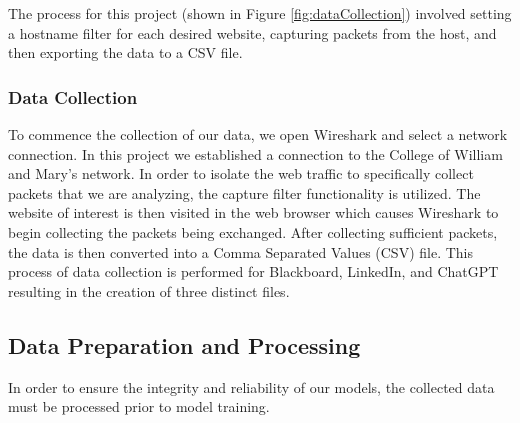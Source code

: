 \documentclass[10pt,sigconf,letterpaper,nonacm]{acmart}
\begin{document}
 The process for this project (shown in Figure \ref{fig:dataCollection}) involved setting a hostname filter for each desired website, capturing packets from the host, and then exporting the data to a CSV file.

 \subsubsection{Data Collection}
To commence the collection of our data, we open Wireshark and select a network connection. 
In this project we established a connection to the College of William and Mary's network. In order to isolate the web traffic to specifically collect 
packets that we are analyzing, the capture filter functionality is utilized. The website of interest is then visited in the web browser which causes Wireshark to begin collecting the packets being exchanged.
After collecting sufficient packets, the data is then converted into a Comma Separated Values (CSV) file. This process of data collection is performed for Blackboard, LinkedIn, and ChatGPT resulting in the creation of 
three distinct files. 

\subsection{Data Preparation and Processing}
In order to ensure the integrity and reliability of our models,
the collected data must be processed prior to model training.
\end{document}
